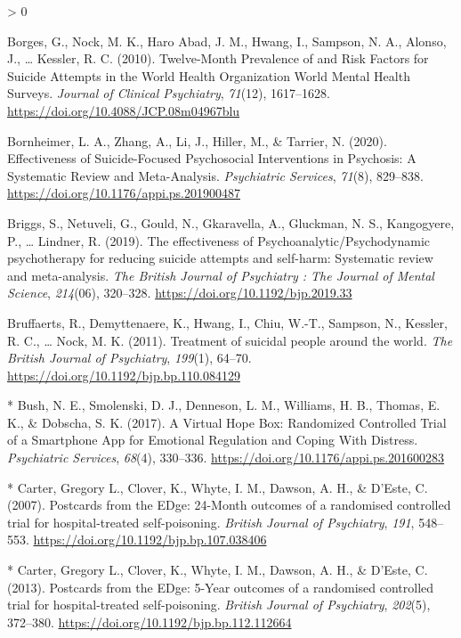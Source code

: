\documentclass[
  english,
  man]{apa6}
\newlength{\cslhangindent}
\newenvironment{CSLReferences}[2] %
 {%
  \setlength{\parindent}{0pt}
  \ifodd #1 \everypar{\setlength{\hangindent}{\cslhangindent}}\ignorespaces\fi
  \ifnum #2 > 0
  \setlength{\parskip}{#2\baselineskip}
  \fi
 }%
 {}
\begin{document}
\begin{CSLReferences}{1}{0}
\leavevmode\hypertarget{ref-borges2010}{}%
Borges, G., Nock, M. K., Haro Abad, J. M., Hwang, I., Sampson, N. A., Alonso, J., \ldots{} Kessler, R. C. (2010). Twelve-{Month Prevalence} of and {Risk Factors} for {Suicide Attempts} in the {World Health Organization World Mental Health Surveys}. \emph{Journal of Clinical Psychiatry}, \emph{71}(12), 1617--1628. \url{https://doi.org/10.4088/JCP.08m04967blu}

\leavevmode\hypertarget{ref-bornheimer2020}{}%
Bornheimer, L. A., Zhang, A., Li, J., Hiller, M., \& Tarrier, N. (2020). Effectiveness of {Suicide}-{Focused Psychosocial Interventions} in {Psychosis}: A {Systematic Review} and {Meta}-{Analysis}. \emph{Psychiatric Services}, \emph{71}(8), 829--838. \url{https://doi.org/10.1176/appi.ps.201900487}

\leavevmode\hypertarget{ref-briggs2019}{}%
Briggs, S., Netuveli, G., Gould, N., Gkaravella, A., Gluckman, N. S., Kangogyere, P., \ldots{} Lindner, R. (2019). The effectiveness of {Psychoanalytic}/{Psychodynamic} psychotherapy for reducing suicide attempts and self-harm: Systematic review and meta-analysis. \emph{The British Journal of Psychiatry : The Journal of Mental Science}, \emph{214}(06), 320--328. \url{https://doi.org/10.1192/bjp.2019.33}

\leavevmode\hypertarget{ref-bruffaerts2011}{}%
Bruffaerts, R., Demyttenaere, K., Hwang, I., Chiu, W.-T., Sampson, N., Kessler, R. C., \ldots{} Nock, M. K. (2011). Treatment of suicidal people around the world. \emph{The British Journal of Psychiatry}, \emph{199}(1), 64--70. \url{https://doi.org/10.1192/bjp.bp.110.084129}

\leavevmode\hypertarget{ref-bush2017}{}%
* Bush, N. E., Smolenski, D. J., Denneson, L. M., Williams, H. B., Thomas, E. K., \& Dobscha, S. K. (2017). A {Virtual Hope Box}: Randomized {Controlled Trial} of a {Smartphone App} for {Emotional Regulation} and {Coping With Distress}. \emph{Psychiatric Services}, \emph{68}(4), 330--336. \url{https://doi.org/10.1176/appi.ps.201600283}

\leavevmode\hypertarget{ref-carter2007}{}%
* Carter, Gregory L., Clover, K., Whyte, I. M., Dawson, A. H., \& D'Este, C. (2007). Postcards from the {EDge}: 24-{Month} outcomes of a randomised controlled trial for hospital-treated self-poisoning. \emph{British Journal of Psychiatry}, \emph{191}, 548--553. \url{https://doi.org/10.1192/bjp.bp.107.038406}

\leavevmode\hypertarget{ref-carter2013}{}%
* Carter, Gregory L., Clover, K., Whyte, I. M., Dawson, A. H., \& D'Este, C. (2013). Postcards from the {EDge}: 5-{Year} outcomes of a randomised controlled trial for hospital-treated self-poisoning. \emph{British Journal of Psychiatry}, \emph{202}(5), 372--380. \url{https://doi.org/10.1192/bjp.bp.112.112664}


\end{CSLReferences}
\end{document}
